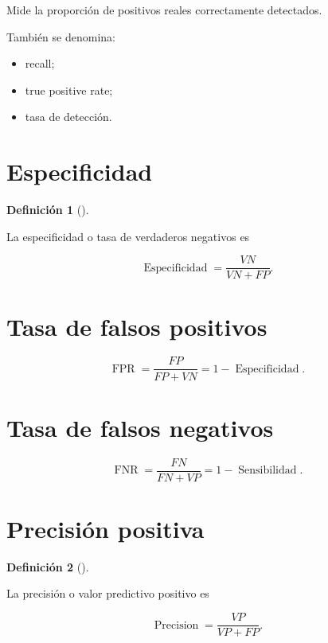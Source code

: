 \documentclass[
  spanish,
  11pt,
  letterpaper,
  DIV=11,
  numbers=noendperiod]{scrreprt}
\providecommand{\tightlist}{%
  \setlength{\itemsep}{0pt}\setlength{\parskip}{0pt}}
\theoremstyle{definition}
\newtheorem{definition}{Definición}[chapter]
\theoremstyle{plain}
\theoremstyle{definition}
\theoremstyle{remark}
\begin{document}
Mide la proporción de positivos reales correctamente detectados.

También se denomina:

\begin{itemize}
\tightlist
\item
  recall;
\item
  true positive rate;
\item
  tasa de detección.
\end{itemize}

\section{Especificidad}\label{especificidad}

\begin{definition}[]\protect\hypertarget{def-especificidad}{}\label{def-especificidad}

La especificidad o tasa de verdaderos negativos es

\[
\operatorname{Especificidad}
=
\frac{
VN
}{
VN+FP
}.
\]

\end{definition}

\section{Tasa de falsos positivos}\label{tasa-de-falsos-positivos}

\[
\operatorname{FPR}
=
\frac{
FP
}{
FP+VN
}
=
1-
\operatorname{Especificidad}.
\]

\section{Tasa de falsos negativos}\label{tasa-de-falsos-negativos}

\[
\operatorname{FNR}
=
\frac{
FN
}{
FN+VP
}
=
1-
\operatorname{Sensibilidad}.
\]

\section{Precisión positiva}\label{precisiuxf3n-positiva}

\begin{definition}[]\protect\hypertarget{def-precision}{}\label{def-precision}

La precisión o valor predictivo positivo es

\[
\operatorname{Precision}
=
\frac{
VP
}{
VP+FP
}.
\]

\end{definition}
\end{document}
